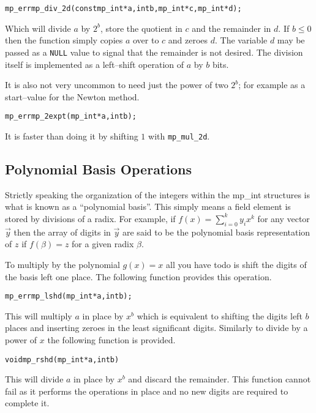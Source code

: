 \documentclass[synpaper]{book}
\begin{document}
\begin{alltt}
mp_err mp_div_2d (const mp_int *a, int b, mp_int *c, mp_int *d);
\end{alltt}
Which will divide $a$ by $2^b$, store the quotient in $c$ and the remainder in $d$.  If $b \le 0$
then the function simply copies $a$ over to $c$ and zeroes $d$. The variable $d$ may be
passed as a \texttt{NULL} value to signal that the remainder is not desired.  The division itself
is implemented as a left--shift operation of $a$ by $b$ bits.

It is also not very uncommon to need just the power of two $2^b$;  for example as a start--value
for
the Newton method.

\begin{alltt}
mp_err mp_2expt(mp_int *a, int b);
\end{alltt}
It is faster than doing it by shifting $1$ with \texttt{mp\_mul\_2d}.

\subsection{Polynomial Basis Operations}

Strictly speaking the organization of the integers within the mp\_int structures is what is known
as a ``polynomial basis''.  This simply  means a field element is stored by divisions of a radix.
For example, if $f(x) = \sum_{i=0}^{k} y_ix^k$ for any vector $\vec y$ then the array of digits in
$\vec y$ are said to be the polynomial basis representation of $z$ if $f(\beta) = z$ for a given
radix $\beta$.

To multiply by the polynomial $g(x) = x$ all you have todo is shift the digits of the basis left
one place.  The following function provides this operation.

\begin{alltt}
mp_err mp_lshd (mp_int *a, int b);
\end{alltt}

This will multiply $a$ in place by $x^b$ which is equivalent to shifting the digits left $b$ places
and inserting zeroes in the least significant digits.  Similarly to divide by a power of $x$ the
following function is provided.

\begin{alltt}
void mp_rshd (mp_int *a, int b)
\end{alltt}
This will divide $a$ in place by $x^b$ and discard the remainder.  This function cannot fail as it
performs the operations in place and no new digits are required to complete it.
\end{document}

